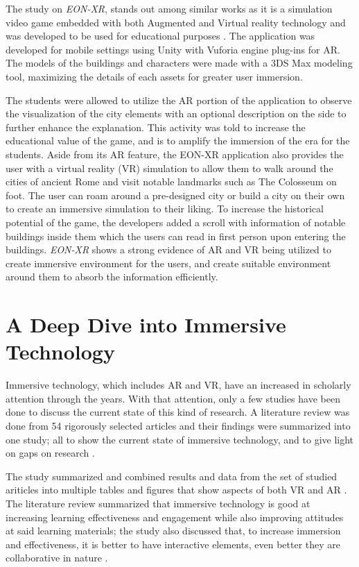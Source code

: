 The study on \textit{EON-XR}, stands out among similar works as it is a simulation video game embedded with both Augmented and Virtual reality technology and was developed to be used for educational purposes \cite{ARVRRome}. The application was developed for mobile settings using Unity with Vuforia engine plug-ins for AR. The models of the buildings and characters were made with a 3DS Max modeling tool, maximizing the details of each assets for greater user immersion. 

The students were allowed to utilize the AR portion of the application to observe the visualization of the city elements with an optional description on the side to further enhance the explanation. This activity was told to increase the educational value of the game, and is to amplify the immersion of the era for the students. Aside from its AR feature, the EON-XR application also provides the user with a virtual reality (VR) simulation to allow them to walk around the cities of ancient Rome and visit notable landmarks such as The Colosseum on foot. The user can roam around a pre-designed city or build a city on their own to create an immersive simulation to their liking. To increase the historical potential of the game, the developers added a scroll with information of notable buildings inside them which the users can read in first person upon entering the buildings. \textit{EON-XR} shows a strong evidence of AR and VR being utilized to create immersive environment for the users, and create suitable environment around them to absorb the information efficiently.


\section{A Deep Dive into Immersive Technology}
Immersive technology, which includes AR and VR, have an increased in scholarly attention through the years. With that attention, only a few studies have been done to discuss the current state of this kind of research. A literature review was done from 54 rigorously selected articles and their findings were summarized into one study; all to show the current state of immersive technology, and to give light on gaps on research \cite{suh2018}.

The study summarized and combined results and data from the set of studied ariticles into multiple tables and figures that show aspects of both VR and AR \cite{suh2018}. The literature review summarized that immersive technology is good at increasing learning effectiveness and engagement while also improving attitudes at said learning materials; the study also discussed that, to increase immersion and effectiveness, it is better to have interactive elements, even better they are collaborative in nature \cite{suh2018}.

